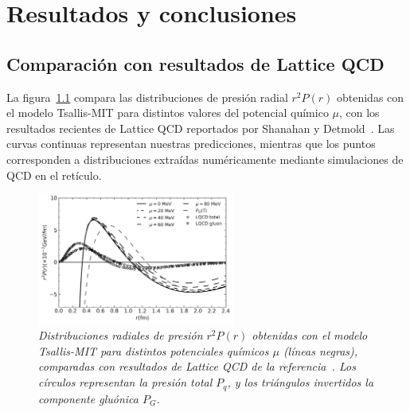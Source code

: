 \chapter{Resultados y conclusiones}
\label{ch-ResultsAndConclusions}

\pagestyle{fancy}
\fancyhf{}
\fancyhead[LE]{\nouppercase{\textbf{\leftmark}\hfill\textit{\rightmark}}}
\fancyhead[RO]{\nouppercase{\textit{\rightmark}\hfill\textbf{\leftmark}}}

\section{Comparación con resultados de Lattice QCD}

La figura~\ref{fig:Results_LQCD} compara las distribuciones de presión radial \( r^2 P(r) \) obtenidas con el modelo Tsallis-MIT para distintos valores del potencial químico \( \mu \), con los resultados recientes de Lattice QCD reportados por Shanahan y Detmold~\cite{shanahanPressureDistributionShear2019}. Las curvas continuas representan nuestras predicciones, mientras que los puntos corresponden a distribuciones extraídas numéricamente mediante simulaciones de QCD en el retículo.

\begin{figure}
    \centering
    \includegraphics[width=0.58\textwidth]{./Images/MIT-BagModel.png}
    \caption[Comparación de presión radial con Lattice QCD]{\emph{Distribuciones radiales de presión \( r^2 P(r) \) obtenidas con el modelo Tsallis-MIT para distintos potenciales químicos \( \mu \) (líneas negras), comparadas con resultados de Lattice QCD de la referencia~\cite{shanahanPressureDistributionShear2019}. Los círculos representan la presión total \( P_q \), y los triángulos invertidos la componente gluónica \( P_G \).}}
    \label{fig:Results_LQCD}
\end{figure}

